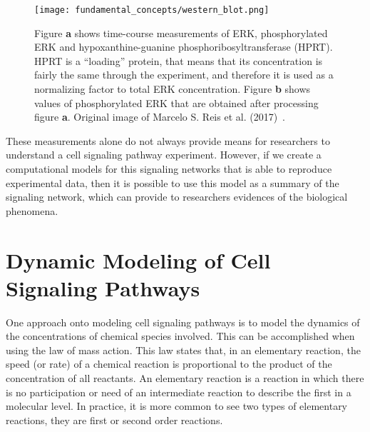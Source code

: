 \begin{figure}[!ht]
\centering
    \texttt{[image: fundamental\_concepts/western\_blot.png]}
    \caption{Figure {\bf a} shows time-course measurements of ERK, 
    phosphorylated ERK and hypoxanthine-guanine 
    phosphoribosyltransferase (HPRT). HPRT is a ``loading'' protein, 
    that means that its concentration is fairly the same through the 
    experiment, and therefore it is used as a normalizing factor to 
    total ERK concentration. Figure  {\bf b} shows values of 
    phosphorylated ERK that are obtained after processing figure 
    {\bf a}. Original image of Marcelo S. Reis et al. 
    (2017)~\cite{Reis2017}.}
    \label{fig:western_blot_example}
\end{figure}

These measurements alone do not always provide means for researchers to 
understand a cell signaling pathway experiment. However, if we create a 
computational models for this signaling networks that is able to 
reproduce experimental data, then it is possible to use this model as a 
summary of the signaling network, which can provide to researchers 
evidences of the biological phenomena.


\section{Dynamic Modeling of Cell Signaling Pathways}
One approach onto modeling cell signaling pathways is to model the 
dynamics of the concentrations of chemical species involved. This can be
accomplished when using the law of mass action. This law states that, 
in an elementary reaction, the speed (or rate) of a chemical reaction is 
proportional to the product of the concentration of all reactants. An 
elementary reaction is a reaction in which there is no participation or 
need of an intermediate reaction to describe the first in a molecular 
level. In practice, it is more common to see two types of elementary 
reactions, they are first or second order reactions. 

